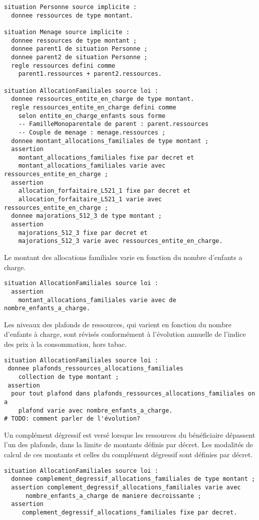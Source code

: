 \documentclass[11pt, french]{article}
\begin{document}
\begin{lstlisting}
situation Personne source implicite :
  donnee ressources de type montant.

situation Menage source implicite :
  donnee ressources de type montant ;
  donnee parent1 de situation Personne ;
  donnee parent2 de situation Personne ;
  regle ressources defini comme
    parent1.ressources + parent2.ressources.

situation AllocationFamiliales source loi :
  donnee ressources_entite_en_charge de type montant.
  regle ressources_entite_en_charge defini comme
    selon entite_en_charge_enfants sous forme
    -- FamilleMonoparentale de parent : parent.ressources
    -- Couple de menage : menage.ressources ;
  donnee montant_allocations_familiales de type montant ;
  assertion
    montant_allocations_familiales fixe par decret et
    montant_allocations_familiales varie avec ressources_entite_en_charge ;
  assertion
    allocation_forfaitaire_L521_1 fixe par decret et
    allocation_forfaitaire_L521_1 varie avec ressources_entite_en_charge ;
  donnee majorations_512_3 de type montant ;
  assertion
    majorations_512_3 fixe par decret et
    majorations_512_3 varie avec ressources_entite_en_charge.
\end{lstlisting}
Le montant des allocations familiales varie en fonction du nombre d'enfants a charge.
\begin{lstlisting}
situation AllocationFamiliales source loi :
  assertion
    montant_allocations_familiales varie avec de nombre_enfants_a_charge.
\end{lstlisting}
Les niveaux des plafonds de ressources, qui varient en fonction du nombre d'enfants à charge, sont révisés conformément à l'évolution annuelle de l'indice des prix à la consommation, hors tabac.
\begin{lstlisting}
situation AllocationFamiliales source loi :
 donnee plafonds_ressources_allocations_familiales
    collection de type montant ;
 assertion
  pour tout plafond dans plafonds_ressources_allocations_familiales on a
    plafond varie avec nombre_enfants_a_charge.
# TODO: comment parler de l'évolution?
\end{lstlisting}
Un complément dégressif est versé lorsque les ressources du bénéficiaire dépassent l'un des plafonds, dans la limite de montants définis par décret. Les modalités de calcul de ces montants et celles du complément dégressif sont définies par décret.
\begin{lstlisting}
situation AllocationFamiliales source loi :
  donnee complement_degressif_allocations_familiales de type montant ;
  assertion complement_degressif_allocations_familiales varie avec
      nombre_enfants_a_charge de maniere decroissante ;
  assertion
     complement_degressif_allocations_familiales fixe par decret.
\end{lstlisting}
\end{document}
